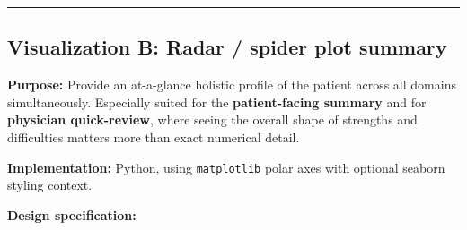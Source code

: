 \begin{center}\rule{0.5\linewidth}{0.5pt}\end{center}

\subsection{Visualization B: Radar / spider plot
summary}\label{visualization-b-radar--spider-plot-summary}

\textbf{Purpose:} Provide an at-a-glance holistic profile of the patient
across all domains simultaneously. Especially suited for the
\textbf{patient-facing summary} and for \textbf{physician quick-review},
where seeing the overall shape of strengths and difficulties matters
more than exact numerical detail.

\textbf{Implementation:} Python, using
\passthrough{\lstinline!matplotlib!} polar axes with optional seaborn
styling context.

\textbf{Design specification:}

